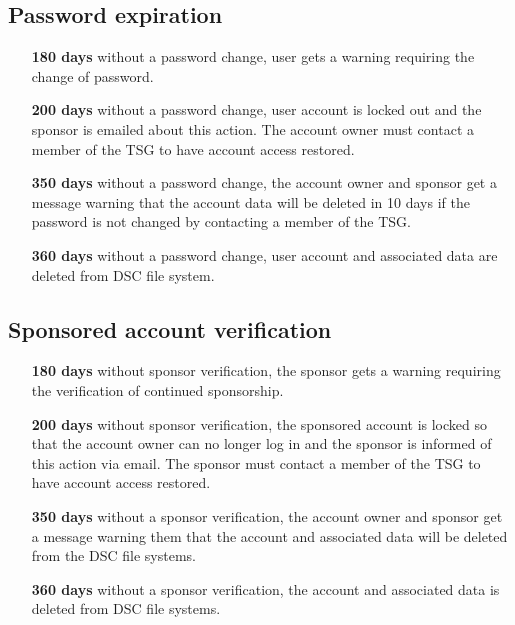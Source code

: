 \documentclass[12pt,a4paper]{article}
\begin{document}
\subsection{Password expiration}
\begin{itemize}
    \item[\textbf{180 days}] without a password change, user gets a warning requiring the change of password.
    \item[\textbf{200 days}] without a password change, user account is locked out and the sponsor is emailed about this action. The account owner must contact a member of the TSG to have account access restored.
    \item[\textbf{350 days}] without a password change, the account owner and sponsor get a message warning that the account data will be deleted in 10 days if the password is not changed by contacting a member of the TSG.
    \item[\textbf{360 days}] without a password change, user account and associated data are deleted from DSC file system.
\end{itemize}

\subsection{Sponsored account verification}
\begin{itemize}
    \item[\textbf{180 days}] without sponsor verification, the sponsor gets a warning requiring the verification of continued sponsorship.
    \item[\textbf{200 days}] without sponsor verification, the sponsored account is locked so that the account owner can no longer log in and the sponsor is informed of this action via email. The sponsor must contact a member of the TSG to have account access restored.
    \item[\textbf{350 days}] without a sponsor verification, the account owner and sponsor get a message warning them that the account and associated data will be deleted from the DSC file systems.
    \item[\textbf{360 days}] without a sponsor verification, the account and associated data is deleted from DSC file systems.
\end{itemize}
\end{document}
